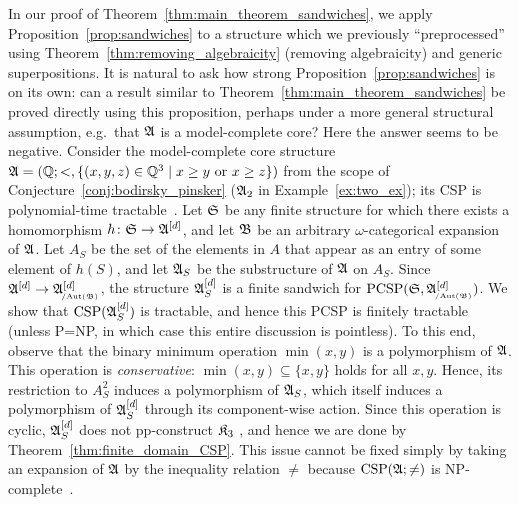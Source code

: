 In our proof of Theorem~\ref{thm:main_theorem_sandwiches}, we apply   Proposition~\ref{prop:sandwiches} to a structure which we previously ``preprocessed'' using Theorem~\ref{thm:removing_algebraicity} (removing algebraicity) and generic superpositions. 
It is natural to ask how strong Proposition~\ref{prop:sandwiches} is on its own: can a result similar to Theorem~\ref{thm:main_theorem_sandwiches} be proved directly using this proposition,  perhaps under a  more general structural assumption, e.g.~that  $\mathfrak{A}$ is a model-complete core?
%
Here the answer seems to be negative.
% 
Consider the model-complete core  structure $\mathfrak{A}=(\mathbb{Q};<,\{(x,y,z) \in \mathbb{Q}^{3} \mid x\geq y \text{ or } x\geq z\})$ from the scope of  Conjecture~\ref{conj:bodirsky_pinsker} ($\mathfrak{A}_2$ in Example~\ref{ex:two_ex}); its CSP is  polynomial-time tractable~\cite{ComplOfTempCSPs}.
%
Let $\mathfrak{S}$ be any finite structure for which there exists a homomorphism $h\colon \mathfrak{S}\rightarrow {\mathfrak{A}}^{[d]}$, and let $\mathfrak{B}$ be an arbitrary $\omega$-categorical expansion of $\mathfrak{A}$.
%
Let $A_S$ be the set of the elements in $A$ that appear as an entry of some element of $h(S)$, and let  $\mathfrak{A}_S$ be the substructure of $\mathfrak{A}$ on $A_S$.
%
Since $\fpwr{\struct{A}}{d}\to \smash{\fpwr{\struct{A}}{d}_{\orbeq{\Aut(\struct{B})}}}$, the structure ${\mathfrak{A}}^{[d]}_S$ is a finite sandwich for $\PCSP(\struct{S},\fpwr{\struct{A}}{d}_{\orbeq{\Aut(\struct{B})}})$.
%
 We show that $\mathrm{CSP}(\smash{{\mathfrak{A}}^{[d]}_S})$ is tractable, and hence this PCSP is finitely tractable (unless P=NP, in which case this entire discussion is pointless).
 To this end, observe that the binary minimum operation $\min(x,y)$ is a polymorphism of $\mathfrak{A}$. This operation is \emph{conservative}:
 $\min(x,y)\subseteq \{x,y\}$ holds for all $x,y$.
 Hence, its restriction to $A_S^2$ induces a polymorphism of $\mathfrak{A}_S$, which itself induces a polymorphism of ${\mathfrak{A}}^{[d]}_S$ through its component-wise action.
 Since this operation is cyclic, ${\mathfrak{A}}^{[d]}_S$ does not pp-construct $\mathfrak{K}_3$ \cite[Theorem 1.4]{barto2018wonderland}, and hence we are done by Theorem~\ref{thm:finite_domain_CSP}.
 This issue cannot be fixed simply by taking an expansion of $\mathfrak{A}$ by the inequality relation $\neq$ because $\mathrm{CSP}(\mathfrak{A};\neq)$ is NP-complete~\cite{ComplOfTempCSPs}.
 


